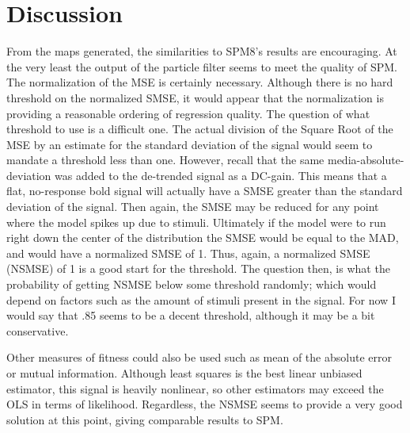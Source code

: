 \section{Discussion}
From the maps generated, the similarities to SPM8's results are encouraging. At the 
very least the output of the particle filter seems to meet the quality of SPM. The normalization
of the MSE is certainly necessary. Although there is no hard threshold on the 
normalized SMSE, it would appear that the normalization is providing a reasonable
ordering of regression quality. The question of what threshold to use is a difficult one.
The actual division of the Square Root of the MSE by an estimate for the standard deviation
of the signal would seem to mandate a threshold less than one. However, recall that the 
same media-absolute-deviation was added to the de-trended signal as a DC-gain. This means
that a flat, no-response bold signal will actually have a SMSE greater than the standard 
deviation of the signal. Then again, the SMSE may be reduced for any point where the 
model spikes up due to stimuli. Ultimately if the model were to run right down the 
center of the distribution the SMSE would be equal to the MAD, and would have a 
normalized SMSE of 1. Thus, again, a normalized SMSE (NSMSE) of 1 is a good start for the 
threshold. The question then, is what the probability of getting NSMSE below some 
threshold randomly; which would depend on factors such as the amount of stimuli
present in the signal. For now I would say that .85 seems to be a decent threshold,
although it may be a bit conservative. 

Other measures of fitness could also be used such as mean of the absolute error or 
mutual information. Although least squares is the best linear unbiased estimator,
this signal is heavily nonlinear, so other estimators may exceed the OLS in terms
of likelihood. Regardless, the NSMSE seems to provide a very good solution at this
point, giving comparable results to SPM.
